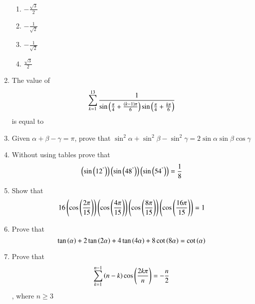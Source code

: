\begin{enumerate}[label=\thesubsection.\arabic*,ref=\thesubsection.\theenumi]
        \hfill{}
        \begin{enumerate}
                \item $-\frac{\sqrt{3}}{2}$
                \item $-\frac{1}{\sqrt{2}}$
                \item $-\frac{1}{\sqrt{2}}$
                \item $\frac{\sqrt{3}}{2}$
        \end{enumerate}
\item The value of 
\begin{align*}
\sum_{k=1}^{13} \frac{1}{\sin\left(\frac{\pi}{4} + \frac{\left(k-1\right)\pi}{6}\right)\sin\left(\frac{\pi}{4} + \frac{k\pi}{6}\right)}
\end{align*}
is equal to
\hfill{}
\begin{enumerate}
\end{enumerate}
\item Given $\alpha+\beta-\gamma=\pi$, prove that $\sin^2{\alpha}+\sin^2{\beta}-\sin^2{\gamma}=2\sin{\alpha}\sin{\beta}\cos{\gamma}$ \hfill{}
\item Without using tables prove that 
$$ 
\left(\sin\left(12^{\degree}\right)\right)\left(\sin\left(48^{\degree}\right)\right)\left(\sin\left(54^{\degree}\right)\right)= \frac{1}{8}
$$
\hfill {}
\item Show that 
$$
16\left(\cos\left(\frac{2\pi}{15}\right)\right)\left(\cos\left(\frac{4\pi}{15}\right)\right)\left(\cos\left(\frac{8\pi}{15}\right)\right)\left(\cos\left(\frac{16\pi}{15}\right)\right)=1
$$
\hfill{}
\item Prove that 
$$
\tan \left(\alpha\right)+2\tan \left(2\alpha\right)+4\tan \left(4\alpha\right)+8\cot \left(8\alpha\right)=\cot \left(\alpha\right)
$$
\hfill{}
\item Prove that 
$$
\sum_{k=1}^{n-1} \left(n-k\right)\cos\left( \frac{2k\pi}{n}\right)=-\frac{n}{2}
$$
, where $n\ge3$
\hfill{}
\end{enumerate}
